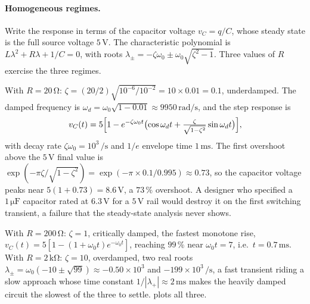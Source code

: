 \paragraph{Homogeneous regimes.} Write the response in terms of the
capacitor voltage $v_{C} = q/C$, whose steady state is the full
source voltage $5\,\si{\volt}$. The characteristic polynomial is
$L\lambda^{2} + R\lambda + 1/C = 0$, with roots $\lambda_{\pm} =
-\zeta\omega_{0} \pm \omega_{0}\sqrt{\zeta^{2} - 1}$. Three values of
$R$ exercise the three regimes.

With $R = 20\,\si{\ohm}$: $\zeta = (20/2)\sqrt{10^{-6}/10^{-2}} =
10\times 0.01 = 0.1$, underdamped. The damped frequency is
$\omega_{d} = \omega_{0}\sqrt{1 - 0.01} \approx
9950\,\si{\radian\per\second}$, and the step response is
\[
v_{C}(t) = 5\Bigl[1 - e^{-\zeta\omega_{0} t}\bigl(\cos\omega_{d} t +
\tfrac{\zeta}{\sqrt{1-\zeta^{2}}}\sin\omega_{d} t\bigr)\Bigr],
\]
with decay rate $\zeta\omega_{0} = 10^{3}\,\si{\per\second}$ and
$1/e$ envelope time $1\,\si{\milli\second}$. The first overshoot
above the $5\,\si{\volt}$ final value is $\exp(-\pi\zeta/
\sqrt{1-\zeta^{2}}) = \exp(-\pi\times 0.1/0.995) \approx 0.73$, so
the capacitor voltage peaks near $5(1 + 0.73) = 8.6\,\si{\volt}$, a
$73\,\%$ overshoot. A designer who specified a $1\,\si{\micro\farad}$
capacitor rated at $6.3\,\si{\volt}$ for a $5\,\si{\volt}$ rail would
destroy it on the first switching transient, a failure that the
steady-state analysis never shows.

With $R = 200\,\si{\ohm}$: $\zeta = 1$, critically damped, the
fastest monotone rise, $v_{C}(t) = 5[1 - (1 + \omega_{0} t)
e^{-\omega_{0} t}]$, reaching $99\,\%$ near $\omega_{0} t = 7$, i.e.\
$t = 0.7\,\si{\milli\second}$. With $R = 2\,\si{\kilo\ohm}$: $\zeta
= 10$, overdamped, two real roots $\lambda_{\pm} = \omega_{0}(-10
\pm\sqrt{99}) \approx -0.50\times 10^{3}$ and $-199\times 10^{3}\,
\si{\per\second}$, a fast transient riding a slow approach whose
time constant $1/|\lambda_{+}| \approx 2\,\si{\milli\second}$ makes
the heavily damped circuit the slowest of the three to settle.
 plots all three.



